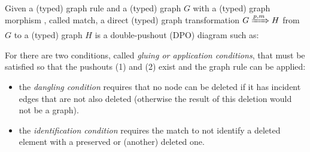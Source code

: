 \begin{definition} Given a (typed) graph rule \graphrule{} and a (typed) graph $G$ with a (typed) graph morphism \match, called match, a direct (typed) graph transformation $G \xRightarrow{p,m} H$ from $G$ to a (typed) graph $H$ is a double-pushout (DPO) diagram such as:


  For  there are two conditions, called \emph{gluing or application conditions}, that must be satisfied so that the pushouts (1) and (2) exist and the graph rule can be applied:

\begin{itemize}
  \item the \emph{dangling condition} requires that no node can be deleted if it has incident edges that are not also deleted (otherwise the result of this deletion would not be a graph).
  \item the \emph{identification condition} requires the match to not identify a deleted element with a preserved or (another) deleted one.
\end{itemize}

\end{definition}

